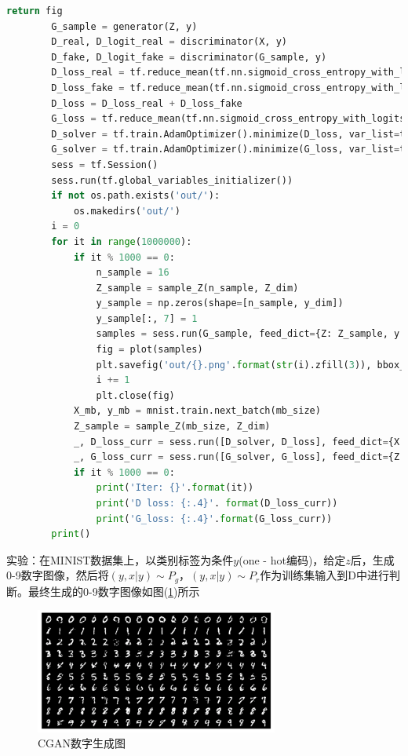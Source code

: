 \begin{lstlisting}[language = Python]
            return fig
        G_sample = generator(Z, y)
        D_real, D_logit_real = discriminator(X, y)
        D_fake, D_logit_fake = discriminator(G_sample, y)
        D_loss_real = tf.reduce_mean(tf.nn.sigmoid_cross_entropy_with_logits(logits=D_logit_real, labels=tf.ones_like(D_logit_real)))
        D_loss_fake = tf.reduce_mean(tf.nn.sigmoid_cross_entropy_with_logits(logits=D_logit_fake, labels=tf.zeros_like(D_logit_fake)))
        D_loss = D_loss_real + D_loss_fake
        G_loss = tf.reduce_mean(tf.nn.sigmoid_cross_entropy_with_logits(logits=D_logit_fake, labels=tf.ones_like(D_logit_fake)))
        D_solver = tf.train.AdamOptimizer().minimize(D_loss, var_list=theta_D)
        G_solver = tf.train.AdamOptimizer().minimize(G_loss, var_list=theta_G)
        sess = tf.Session()
        sess.run(tf.global_variables_initializer())
        if not os.path.exists('out/'):
            os.makedirs('out/')
        i = 0
        for it in range(1000000):
            if it % 1000 == 0:
                n_sample = 16
                Z_sample = sample_Z(n_sample, Z_dim)
                y_sample = np.zeros(shape=[n_sample, y_dim])
                y_sample[:, 7] = 1
                samples = sess.run(G_sample, feed_dict={Z: Z_sample, y:y_sample})
                fig = plot(samples)
                plt.savefig('out/{}.png'.format(str(i).zfill(3)), bbox_inches='tight')
                i += 1
                plt.close(fig)
            X_mb, y_mb = mnist.train.next_batch(mb_size)
            Z_sample = sample_Z(mb_size, Z_dim)
            _, D_loss_curr = sess.run([D_solver, D_loss], feed_dict={X: X_mb, Z: Z_sample, y:y_mb})
            _, G_loss_curr = sess.run([G_solver, G_loss], feed_dict={Z: Z_sample, y:y_mb})
            if it % 1000 == 0:
                print('Iter: {}'.format(it))
                print('D loss: {:.4}'. format(D_loss_curr))
                print('G_loss: {:.4}'.format(G_loss_curr))
        print()
        \end{lstlisting}
        \par
        实验：在MINIST数据集上，以类别标签为条件$y$(one - hot编码)，给定$z$后，生成0-9数字图像，然后将$(y,x|y)\sim P_g$，$(y,x|y)\sim P_r$作为训练集输入到D中进行判断。最终生成的0-9数字图像如图(\ref{fig:CGAN数字生成图})所示
                \begin{figure}[H]
                \centering
                \includegraphics[width=8cm]{images/CGAN_number.jpg}
                \caption{CGAN数字生成图}
                \label{fig:CGAN数字生成图}
                \end{figure}

